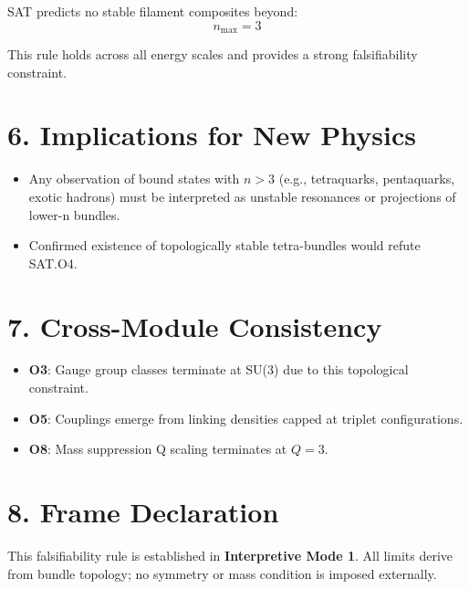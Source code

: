 \documentclass[12pt]{article}
\begin{document}
SAT predicts no stable filament composites beyond:
\[
n_{\text{max}} = 3
\]

This rule holds across all energy scales and provides a strong falsifiability constraint.

\section*{6. Implications for New Physics}

\begin{itemize}
    \item Any observation of bound states with \( n > 3 \) (e.g., tetraquarks, pentaquarks, exotic hadrons) must be interpreted as unstable resonances or projections of lower-n bundles.
    \item Confirmed existence of topologically stable tetra-bundles would refute SAT.O4.
\end{itemize}

\section*{7. Cross-Module Consistency}

\begin{itemize}
    \item \textbf{O3}: Gauge group classes terminate at SU(3) due to this topological constraint.
    \item \textbf{O5}: Couplings emerge from linking densities capped at triplet configurations.
    \item \textbf{O8}: Mass suppression Q scaling terminates at \( Q = 3 \).
\end{itemize}

\section*{8. Frame Declaration}

This falsifiability rule is established in \textbf{Interpretive Mode 1}. All limits derive from bundle topology; no symmetry or mass condition is imposed externally.
\end{document}
